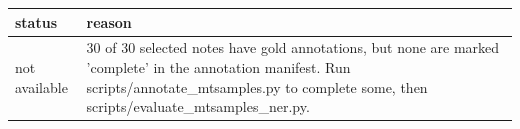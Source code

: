 \begin{tabular}{ll}
\toprule
status & reason \\
\midrule
not available & 30 of 30 selected notes have gold annotations, but none are marked 'complete' in the annotation manifest. Run scripts/annotate\_mtsamples.py to complete some, then scripts/evaluate\_mtsamples\_ner.py. \\
\bottomrule
\end{tabular}
